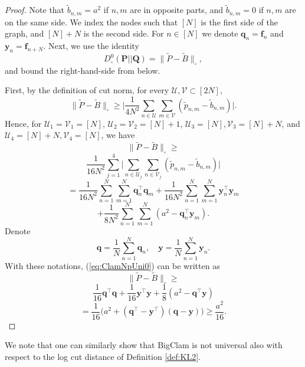 \documentclass[letterpaper]{article} %
\begin{document}
\begin{proof}
    
Note that $\tilde{b}_{n,m}=a^2$ if $n,m$ are in opposite parts, and $\tilde{b}_{n,m}=0$ if $n,m$ are on the same side.
We index the nodes such that $[N]$ is the first side of the graph, and $[N]+N$ is the second side. For $n\in[N]$ we denote $\mathbf{q}_n=\mathbf{f}_n$ and  $\mathbf{y}_n=\mathbf{f}_{n+N}$.
Next, we use the identity 
\[D^0_{\square}(\mathbf{P} || \mathbf{Q}) = \| \tilde{P}-\tilde{B}\|_{\square },\]
and bound the right-hand-side from below.

First, by the definition of cut norm, for every $\mathcal{U},\mathcal{V}\subset[2N]$,
\[\| \tilde{P}-\tilde{B}\|_{\square} \geq \Big|\frac{1}{4N^2}\sum_{n\in \mathcal{U}}\sum_{m\in \mathcal{V}} (\tilde{p}_{n,m} - \tilde{b}_{n,m})\Big|.\]
Hence, for $\mathcal{U}_1=\mathcal{V}_1=[N]$, $\mathcal{U}_2=\mathcal{V}_2=[N]+1$, $\mathcal{U}_3=[N],\mathcal{V}_3=[N]+N$, and $\mathcal{U}_4=[N]+N,\mathcal{V}_4=[N]$, we have
\[\| \tilde{P}-\tilde{B}\|_{\square} \geq \]
\[\frac{1}{16N^2}\sum_{j=1}^4 \Big|\sum_{n\in \mathcal{U}_j}\sum_{n\in \mathcal{V}_j} (\tilde{p}_{n,m} - \tilde{b}_{n,m})\Big| \]
\[= \frac{1}{16N^2}\sum_{n=1}^N\sum_{m=1}^{N} \mathbf{q}_n^\top \mathbf{q}_m  + \frac{1}{16N^2}\sum_{n=1}^N\sum_{m=1}^{N} \mathbf{y}_n^\top \mathbf{y}_m \]
\begin{equation}
    \label{eq:ClamNpUni0}
    +\frac{1}{8N^2}\sum_{n=1}^N\sum_{m=1}^{N} ( a^2 -\mathbf{q}_n^\top \mathbf{y}_m).
\end{equation}
Denote 
\[\mathbf{q}=\frac{1}{N}\sum_{n=1}^N \mathbf{q}_n, \quad \mathbf{y}=\frac{1}{N}\sum_{n=1}^N \mathbf{y}_n.\]
With these notations, (\ref{eq:ClamNpUni0}) can be written as
\[\| \tilde{P}-\tilde{B}\|_{\square} \geq \]
\[\frac{1}{16}\mathbf{q}^\top \mathbf{q}  + \frac{1}{16}\mathbf{y}^\top \mathbf{y} +\frac{1}{8}( a^2 -\mathbf{q}^\top \mathbf{y})\]
\[=\frac{1}{16}\Big(a^2 + (\mathbf{q}^\top-\mathbf{y}^\top)(\mathbf{q}-\mathbf{y})\Big) \geq \frac{a^2}{16}.\]
\end{proof}

We note that one can similarly show that BigClam is not universal also with respect to the log cut distance of Definition \ref{def:KL2}.


\begingroup
\color{blue}
\end{document}
